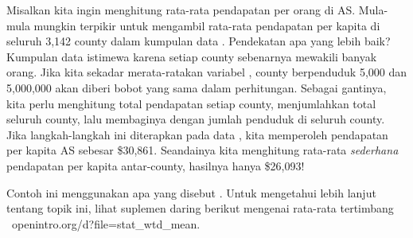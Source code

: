 
\begin{examplewrap}
\begin{nexample}{Misalkan kita ingin menghitung rata-rata
    pendapatan per orang di AS.
    Mula-mula mungkin terpikir untuk mengambil rata-rata
    pendapatan per kapita di seluruh 3,142 county dalam kumpulan
    data . Pendekatan apa yang lebih baik?}
    \label{wtdMeanOfIncome}
  Kumpulan data  istimewa karena setiap county
  sebenarnya mewakili banyak orang.
  Jika kita sekadar merata-ratakan variabel
  , county berpenduduk 5,000 dan
  5,000,000 akan diberi bobot yang sama dalam perhitungan.
  Sebagai gantinya, kita perlu menghitung total pendapatan setiap
  county, menjumlahkan total seluruh county, lalu membaginya dengan
  jumlah penduduk di seluruh county.
  Jika langkah-langkah ini diterapkan pada data ,
  kita memperoleh pendapatan per kapita AS sebesar \$30,861.
  Seandainya kita menghitung rata-rata \emph{sederhana} pendapatan
  per kapita antar-county, hasilnya hanya \$26,093!

  Contoh ini menggunakan apa yang disebut
  .
  Untuk mengetahui lebih lanjut tentang topik ini, lihat
  suplemen daring berikut mengenai rata-rata tertimbang
  \mbox{
      {openintro.org/d?file=stat\_wtd\_mean}}.
\end{nexample}
\end{examplewrap}

